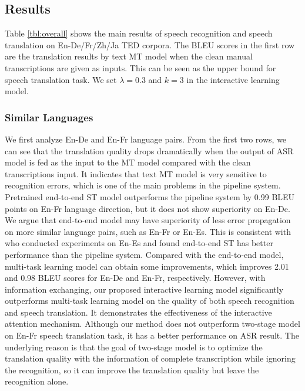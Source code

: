 \documentclass[letterpaper]{article} %
\begin{document}
\subsection{Results}
Table \ref{tbl:overall} shows the main results of speech recognition and speech translation on En-De/Fr/Zh/Ja TED corpora. The BLEU scores in the first row are the translation results by text MT model when the clean manual transcriptions are given as inputs. This can be seen as the upper bound for speech translation task.
We set $\lambda=0.3$ and $k=3$ in the interactive learning model.

\subsubsection{Similar Languages}
We first analyze En-De and En-Fr language pairs. From the first two rows, we can see that the translation quality drops dramatically when the output of ASR model is fed as the input to the MT model compared with the clean transcriptions input. It indicates that text MT model is very sensitive to recognition errors, which is one of the main problems in the pipeline system.
Pretrained end-to-end  ST model outperforms the pipeline system by 0.99 BLEU points on En-Fr language direction, but it does not show superiority on En-De.
We argue that end-to-end model may have superiority of less error propagation on more similar language pairs, such as En-Fr or En-Es. This is consistent with \citeauthor{weiss2017sequence}~ who conducted experiments on En-Es and found end-to-end ST has better performance than the pipeline system.
Compared with the end-to-end model, multi-task learning model can obtain some improvements, which improves 2.01 and 0.98 BLEU scores for En-De and En-Fr, respectively.
However, with information exchanging, our proposed interactive learning model significantly outperforms multi-task learning model on the quality of both speech recognition and speech translation.
It demonstrates the effectiveness of the interactive attention mechanism.
Although our method does not outperform two-stage model on En-Fr speech translation task, it has a better performance on ASR result. The underlying reason is that the goal of two-stage model is to optimize the translation quality with the information of complete transcription while ignoring the recognition, so it can improve the translation quality but leave the recognition alone.
\end{document}
